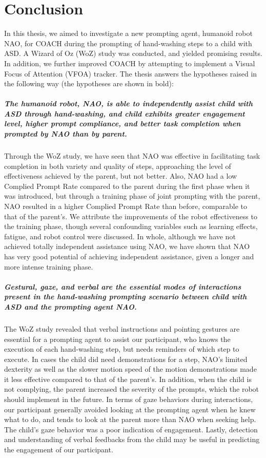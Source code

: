\chapter{Conclusion}
In this thesis, we aimed to investigate a new prompting agent, humanoid robot NAO, for COACH during the prompting of hand-washing steps to a child with ASD.  A Wizard of Oz (WoZ) study was conducted, and yielded promising results.  In addition, we further improved COACH by attempting to implement a Visual Focus of Attention (VFOA) tracker.  The thesis answers the hypotheses raised in the following way (the hypotheses are shown in bold):

\paragraph{The humanoid robot, NAO, is able to independently assist child with ASD through hand-washing, and child exhibits greater engagement level, higher prompt compliance, and better task completion when prompted by NAO than by parent.}
Through the WoZ study, we have seen that NAO was effective in facilitating task completion in both variety and quality of steps, approaching the level of effectiveness achieved by the parent, but not better.  Also, NAO had a low Complied Prompt Rate compared to the parent during the first phase when it was introduced, but through a training phase of joint prompting with the parent, NAO resulted in a higher Complied Prompt Rate than before, comparable to that of the parent's.  We attribute the improvements of the robot effectiveness to the training phase, though several confounding variables such as learning effects, fatigue, and robot control were discussed.  In whole, although we have not achieved totally independent assistance using NAO, we have shown that NAO has very good potential of achieving independent assistance, given a longer and more intense training phase.

\paragraph{Gestural, gaze, and verbal are the essential modes of interactions present in the hand-washing prompting scenario between child with ASD and the prompting agent NAO.}
The WoZ study revealed that verbal instructions and pointing gestures are essential for a prompting agent to assist our participant, who knows the execution of each hand-washing step, but needs reminders of which step to execute.  In cases the child did need demonstrations for a step, NAO's limited dexterity as well as the slower motion speed of the motion demonstrations made it less effective compared to that of the parent's.  In addition, when the child is not complying, the parent increased the severity of the prompts, which the robot should implement in the future.  In terms of gaze behaviors during interactions, our participant generally avoided looking at the prompting agent when he knew what to do, and tends to look at the parent more than NAO when seeking help.  The child's gaze behavior was a poor indication of engagement.  Lastly, detection and understanding of verbal feedbacks from the child may be useful in predicting the engagement of our participant.

